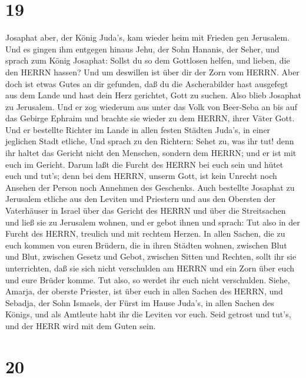 \hypertarget{section-18}{%
\section{19}\label{section-18}}

 Josaphat aber, der König Juda's, kam wieder heim mit
Frieden gen Jerusalem.  Und es gingen ihm entgegen hinaus
Jehu, der Sohn Hananis, der Seher, und sprach zum König Josaphat: Sollst
du so dem Gottlosen helfen, und lieben, die den HERRN hassen? Und um
deswillen ist über dir der Zorn vom HERRN.  Aber doch ist
etwas Gutes an dir gefunden, daß du die Ascherabilder hast ausgefegt aus
dem Lande und hast dein Herz gerichtet, Gott zu suchen. 
Also blieb Josaphat zu Jerusalem. Und er zog wiederum aus unter das Volk
von Beer-Seba an bis auf das Gebirge Ephraim und brachte sie wieder zu
dem HERRN, ihrer Väter Gott.  Und er bestellte Richter im
Lande in allen festen Städten Juda's, in einer jeglichen Stadt etliche,
 Und sprach zu den Richtern: Sehet zu, was ihr tut! denn ihr
haltet das Gericht nicht den Menschen, sondern dem HERRN; und er ist mit
euch im Gericht.  Darum laßt die Furcht des HERRN bei euch
sein und hütet euch und tut's; denn bei dem HERRN, unserm Gott, ist kein
Unrecht noch Ansehen der Person noch Annehmen des Geschenks.
 Auch bestellte Josaphat zu Jerusalem etliche aus den
Leviten und Priestern und aus den Obersten der Vaterhäuser in Israel
über das Gericht des HERRN und über die Streitsachen und ließ sie zu
Jerusalem wohnen,  und er gebot ihnen und sprach: Tut also
in der Furcht des HERRN, treulich und mit rechtem Herzen. 
In allen Sachen, die zu euch kommen von euren Brüdern, die in ihren
Städten wohnen, zwischen Blut und Blut, zwischen Gesetz und Gebot,
zwischen Sitten und Rechten, sollt ihr sie unterrichten, daß sie sich
nicht verschulden am HERRN und ein Zorn über euch und eure Brüder komme.
Tut also, so werdet ihr euch nicht verschulden.  Siehe,
Amarja, der oberste Priester, ist über euch in allen Sachen des HERRN,
und Sebadja, der Sohn Ismaels, der Fürst im Hause Juda's, in allen
Sachen des Königs, und als Amtleute habt ihr die Leviten vor euch. Seid
getrost und tut's, und der HERR wird mit dem Guten sein.

\hypertarget{section-19}{%
\section{20}\label{section-19}}

